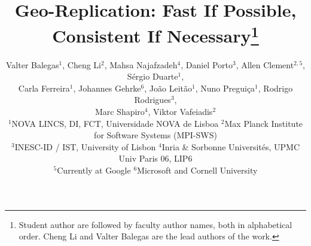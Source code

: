 \documentclass[11pt,dvipdfm]{article}
\begin{document}
\title{Geo-Replication: Fast If Possible, Consistent If Necessary\thanks{Student author are followed by faculty author names, both in alphabetical order. Cheng Li and Valter Balegas are the lead authors of the work.}}

\author{Valter Balegas$^1$, Cheng Li$^2$, Mahsa Najafzadeh$^4$, Daniel Porto$^{3}$, 
Allen Clement$^{2,5}$, Sérgio Duarte$^1$, \\
Carla Ferreira$^1$, Johannes Gehrke$^6$, Jo\~{a}o Leit\~{a}o$^1$, Nuno Preguiça$^1$, Rodrigo Rodrigues$^3$, \\
Marc Shapiro$^4$, Viktor Vafeiadis$^2$\\
\small $^1$NOVA LINCS, DI, FCT, Universidade NOVA de Lisboa
$^2$Max Planck Institute for Software Systems (MPI-SWS)\\
\small $^3$INESC-ID / IST, University of Lisbon 
$^4$Inria \& Sorbonne Universités, UPMC Univ Paris 06, LIP6\\
\small $^5$Currently at Google
$^6$Microsoft and Cornell University}

\graphicspath{{./figures/redblue/redblueOrder/}{./figures/}}

\maketitle









\end{document}
